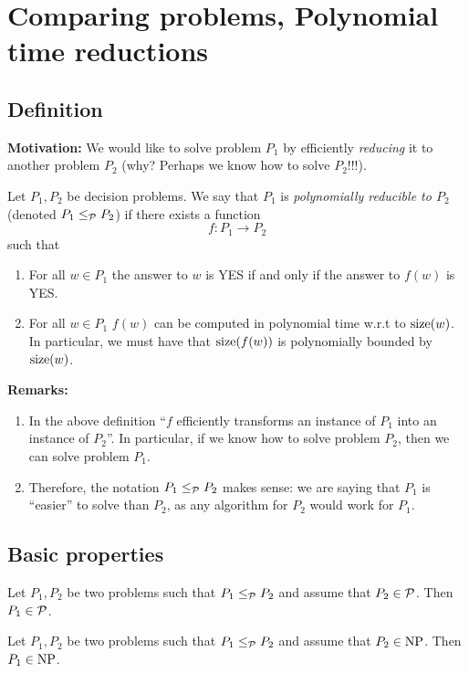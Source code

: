 \documentclass[../open-optimization/open-optimization.tex]{subfiles}
\begin{document}
\section{Comparing problems, Polynomial time reductions}
\subsection{Definition}
{\bf Motivation:} We would like to solve problem $P_1$ by efficiently {\em reducing} it to another problem $P_2$ (why? Perhaps we know how to solve $P_2$!!!).

	\begin{definition} 
Let $P_1,P_2$ be decision problems. We say that $P_1$ is {\em polynomially reducible to $P_2$} (denoted $P_1\leq_{{\mathcal{P}}}P_2$) if there exists a function
$$f:P_1\rightarrow P_2$$
such that 
\begin{enumerate}
	\item For all $w\in P_1$ the answer to $w$ is YES if and only if the answer to $f(w)$ is YES.
	\item For all $w\in P_1$ $f(w)$ can be computed in polynomial time w.r.t to $\textup{size}(w)$. In particular, we must have that $\textup{size}(f(w))$ is polynomially bounded by $\textup{size}(w)$.
\end{enumerate}
\end{definition}

{\bf Remarks:} \begin{enumerate}
	\item In the above definition ``$f$ efficiently transforms an instance of $P_1$ into an instance of $P_2$''. In particular, if we know how to solve problem $P_2$, then we can solve problem $P_1$.
	\item Therefore, the notation $P_1\leq_{{\mathcal{P}}}P_2$ makes sense: we are saying that $P_1$ is ``easier'' to solve than $P_2$, as any algorithm for $P_2$ would work for $P_1$. 
\end{enumerate} 
\subsection{Basic properties}

\begin{proposition} Let $P_1,P_2$ be two problems such that $P_1\leq_{{\mathcal{P}}}P_2$ and assume that $P_2\in {\mathcal{P}}$. Then $P_1\in{\mathcal{P}}$.
\end{proposition}

\begin{proposition} Let $P_1,P_2$ be two problems such that $P_1\leq_{{\mathcal{P}}}P_2$ and assume that $P_2\in \text{NP}$. Then $P_1\in\text{NP}$.
\end{proposition}
\end{document}
